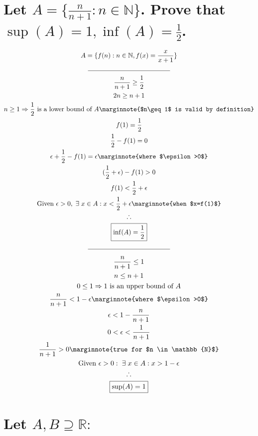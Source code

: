 \documentclass[letterpaper]{article}
\begin{document}
\section{Let $A=\{\frac{n}{n+1}:n\in\mathbb{N}\}$. Prove that $\sup(A)=1, \inf(A)=\frac{1}{2}$.}
\begin{gather*}
A=\{f(n):n\in\mathbb{N},f(x)=\frac{x}{x+1}\} \\
\line(1, 0){125} \\
\frac{n}{n+1}\geq\frac{1}{2} \\
2n\geq n+1 \\
n \geq 1 \Rightarrow \frac{1}{2} \text{ is a lower bound of } A \marginnote{$n\geq1$ is valid by definition} \\
f(1)=\frac{1}{2} \\
\frac{1}{2} - f(1) = 0 \\
\epsilon + \frac{1}{2} - f(1) = \epsilon \marginnote{where $\epsilon>0$} \\
(\frac{1}{2}+\epsilon) - f(1) > 0 \\
f(1)<\frac{1}{2}+\epsilon \\
\text{Given } \epsilon>0, \hspace{3pt} \exists \hspace{3pt} x \in A:x<\frac{1}{2}+\epsilon \marginnote{when $x=f(1)$} \\
\therefore \\
\boxed{\inf(A)=\frac{1}{2}} \\
\line(1, 0){125}
\end{gather*}
\begin{gather*}
\frac{n}{n+1}\leq1 \\
n\leq n+1 \\
0\leq1 \Rightarrow 1 \text{ is an upper bound of } A \\
\frac{n}{n+1} < 1-\epsilon \marginnote{where $\epsilon>0$} \\
\epsilon<1-\frac{n}{n+1} \\
0<\epsilon<\frac{1}{n+1} \\
\frac{1}{n+1}>0 \marginnote{true for $n \in \mathbb{N}$} \\
\text{Given } \epsilon>0: \hspace{3pt} \exists \hspace{3pt} x \in A:x>1-\epsilon  \\
\therefore \\
\boxed{\sup(A)=1}
\end{gather*}

\section{Let $A,B\supseteq\mathbb{R}:$}
\end{document}
